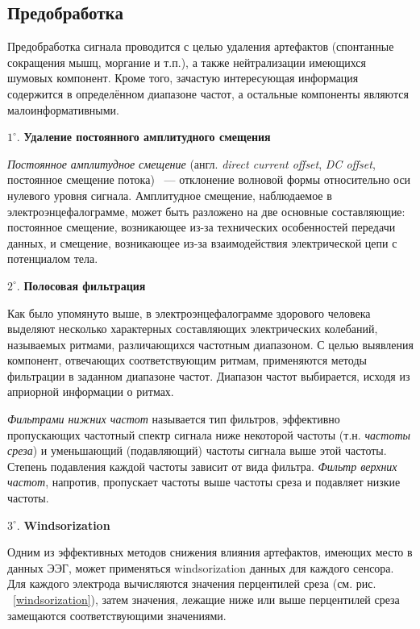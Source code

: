 \documentclass[12pt,fleqn]{article}
\begin{document}
	\subsection{Предобработка}
	\par Предобработка сигнала проводится с целью удаления артефактов (спонтанные сокращения мышц, моргание и т.п.), а также нейтрализации имеющихся шумовых компонент. Кроме того, зачастую интересующая информация содержится в определённом диапазоне частот, а остальные компоненты являются малоинформативными.
	\par $1^{\circ}.$ {\bf Удаление постоянного амплитудного смещения}
	\par {\it Постоянное амплитудное смещение} (англ. {\it direct current offset}, {\it DC offset}, постоянное смещение потока) ~--- отклонение волновой формы относительно оси нулевого уровня сигнала. Амплитудное смещение, наблюдаемое в электроэнцефалограмме, может быть разложено на две основные составляющие: постоянное смещение, возникающее из-за технических особенностей передачи данных, и  смещение, возникающее из-за взаимодействия электрической цепи с потенциалом тела.
	\par $2^{\circ}.$ {\bf Полосовая фильтрация}
	\par Как было упомянуто выше, в электроэнцефалограмме здорового человека выделяют несколько характерных составляющих электрических колебаний, называемых ритмами, различающихся частотным диапазоном. С целью выявления компонент, отвечающих соответствующим ритмам, применяются методы фильтрации в заданном диапазоне частот. Диапазон частот выбирается, исходя из априорной информации о ритмах.
	\par {\it Фильтрами нижних частот} называется тип фильтров, эффективно пропускающих частотный спектр сигнала ниже некоторой частоты (т.н. {\it частоты среза}) и уменьшающий (подавляющий) частоты сигнала выше этой частоты. Степень подавления каждой частоты зависит от вида фильтра. {\it Фильтр верхних частот}, напротив, пропускает частоты выше частоты среза и подавляет низкие частоты.
	\par $3^{\circ}.$ {\bf Windsorization}
	\par Одним из эффективных методов снижения влияния артефактов, имеющих место в данных ЭЭГ, может применяться windsorization данных для каждого сенсора. Для каждого электрода вычисляются значения перцентилей среза (см. рис. ~\ref{windsorization}), затем значения, лежащие ниже или выше перцентилей среза замещаются соответствующими значениями.
\end{document}
